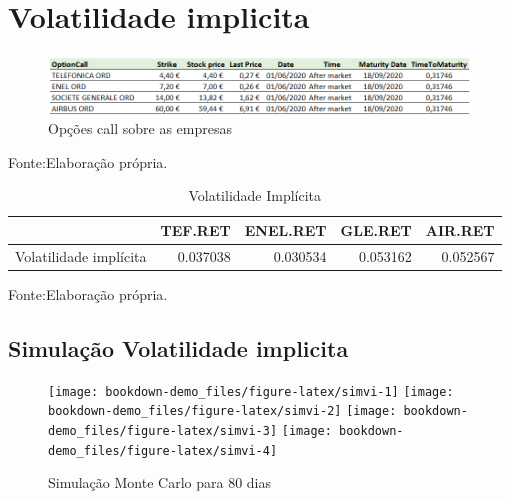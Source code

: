 \documentclass[
  12pt,
  a4paper,
  openany]{book}
\begin{document}
\normalsize

\hypertarget{volatilidade-implicita}{%
\section{Volatilidade implicita}\label{volatilidade-implicita}}

\begin{figure}

{\centering \includegraphics[width=1\linewidth]{image/opcao} 

}

\caption{Opções call sobre as empresas }\label{fig:opcao}
\end{figure}
\FloatBarrier
\centering

Fonte:Elaboração própria.

\justifying
\bigskip

\begin{table}[!h]

\caption{\label{tab:unnamed-chunk-46}Volatilidade Implícita}
\centering
\begin{tabular}[t]{lrrrr}
\toprule
  & TEF.RET & ENEL.RET & GLE.RET & AIR.RET\\
\midrule
Volatilidade implícita & 0.037038 & 0.030534 & 0.053162 & 0.052567\\
\bottomrule
\end{tabular}
\end{table}
\FloatBarrier
\centering

Fonte:Elaboração própria.

\justifying
\bigskip

\hypertarget{simulauxe7uxe3o-volatilidade-implicita}{%
\subsection{Simulação Volatilidade implicita}\label{simulauxe7uxe3o-volatilidade-implicita}}

\scriptsize

\normalsize

\scriptsize

\normalsize

\begin{figure}

{\centering \texttt{[image: bookdown-demo\_files/figure-latex/simvi-1]} \texttt{[image: bookdown-demo\_files/figure-latex/simvi-2]} \texttt{[image: bookdown-demo\_files/figure-latex/simvi-3]} \texttt{[image: bookdown-demo\_files/figure-latex/simvi-4]} 

}

\caption{Simulação Monte Carlo para 80 dias}\label{fig:simvi}
\end{figure}
\end{document}
